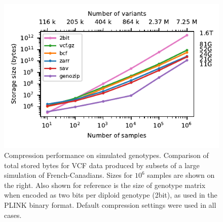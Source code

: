 \documentclass[a4paper,num-refs]{oup-contemporary}
\begin{document}
\begin{figure}
\begin{center}
\includegraphics[]{figures/data-scaling}
\end{center}
\caption{Compression performance on simulated genotypes.
Comparison of total stored bytes for VCF data produced 
by subsets of a large simulation of French-Canadians.
Sizes for $10^6$ samples are shown on the right.
Also shown for reference is the size of genotype matrix 
when encoded as two bits per diploid genotype (2bit), as used 
in the PLINK binary format. Default compression settings were 
used in all cases.
\label{fig-data-storage}}
\end{figure}
\end{document}
